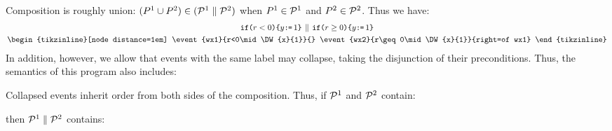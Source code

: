Composition is roughly union:
$(P^1\cup P^2) \in (\mathcal{P}^1 \parallel \mathcal{P}^2)$ when
$P^1 \in \mathcal{P}^1$ and $P^2 \in \mathcal{P}^2$.  Thus we have:
\begin{gather*}
  \IF{r<0}\THEN y\GETS1\FI
  \PAR
  \IF{r\geq0}\THEN y\GETS1\FI
  \\
  \hbox{\begin{tikzinline}[node distance=1em]
  \event{wx1}{r<0\mid\DW{x}{1}}{}
  \event{wx2}{r\geq0\mid\DW{x}{1}}{right=of wx1}
    \end{tikzinline}}
\end{gather*}
In addition, however, we allow that events with the same label may collapse,
taking the disjunction of their preconditions.  Thus, the semantics of this
program also includes:
\begin{tikzdisplay}[node distance=1em]
\end{tikzdisplay}
Collapsed events inherit order from both sides of the composition.
Thus, if
$\mathcal{P}^1$ and $\mathcal{P}^2$ contain:
\begin{tikzdisplay}[node distance=1em]
\end{tikzdisplay}
then $\mathcal{P}^1 \parallel \mathcal{P}^2$ contains:
\begin{tikzdisplay}[node distance=1em]
\end{tikzdisplay}

